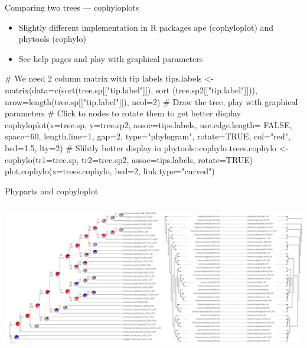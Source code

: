 \documentclass[compress,  xelatex, 11pt, xcolor=x11names, aspectratio=169,
	hyperref={
		bookmarks=true,
		unicode=true,
		colorlinks=true,
		pdftitle={HybSeq course},
		plainpages=false,
		pdfauthor={Vojtech Zeisek},
		pdfsubject={Practical processing of HybSeq target enrichment sequencing data on computing grids like MetaCentrum},
		pdfcreator={XeLaTeX},
		pdfkeywords={BASH, command line, GNU, HybSeq, Linux, MetaCentrum, sequencing shell, target enrichment},
		linkcolor=Turquoise4, %
		anchorcolor=DodgerBlue4, %
		citecolor=DodgerBlue4, %
		filecolor=DodgerBlue4, %
		menucolor=Tan4, %
		urlcolor=DarkOliveGreen4 %
		},
	url={hyphens, lowtilde} %
	]{beamer}
\renewcommand{\texttt}[1]{\colorbox{Cornsilk2}{{\ttfamily #1}}}
\begin{document}
\begin{frame}[fragile]{Comparing two trees --- cophyloplots}
	\begin{itemize}
		\item Slightly different implementation in \texttt{R} packages \texttt{ape} (\texttt{cophyloplot}) and \texttt{phytools} (\texttt{cophylo})
		\item See help pages and play with graphical parameters
	\end{itemize}
	\begin{spluscode}
    # We need 2 column matrix with tip labels
    tips.labels <- matrix(data=c(sort(tree.sp[["tip.label"]]), sort
      (tree.sp2[["tip.label"]])), nrow=length(tree.sp[["tip.label"]]), ncol=2)
    # Draw the tree, play with graphical parameters
    # Click to nodes to rotate them to get better display
    cophyloplot(x=tree.sp, y=tree.sp2, assoc=tips.labels, use.edge.length=
      FALSE, space=60, length.line=1, gap=2, type="phylogram", rotate=TRUE,
      col="red", lwd=1.5, lty=2)
    # Slihtly better display in phytools::cophylo
    trees.cophylo <- cophylo(tr1=tree.sp, tr2=tree.sp2, assoc=tips.labels,
      rotate=TRUE)
    plot.cophylo(x=trees.cophylo, lwd=2, link.type="curved")
	\end{spluscode}
\end{frame}

\begin{frame}{Phyparts and cophyloplot}
	\begin{center}
		\includegraphics[height=6.5cm]{phyparts_cophylo.png}
	\end{center}
\end{frame}
\end{document}
